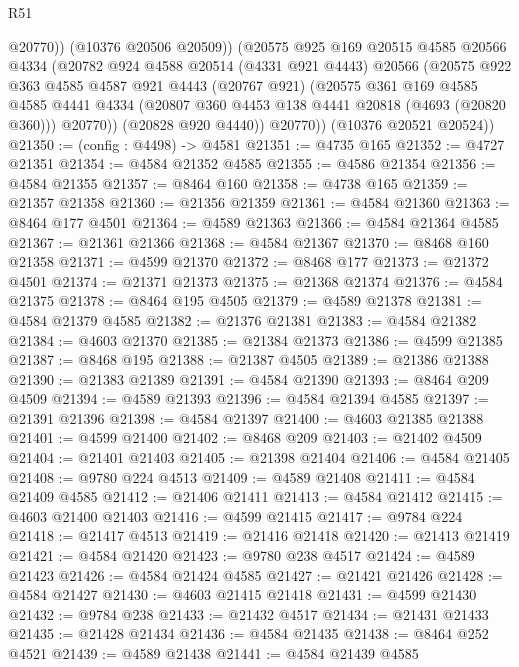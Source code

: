 \begin{lexlean}{R51}
\begin{coremodule}
              @20770))
          (@10376 @20506 @20509))
        (@20575
          @925
          @169
          @20515
          @4585
          @20566
          @4334
          (@20782
            @924
            @4588
            @20514
            (@4331 @921 @4443)
            @20566
            (@20575
              @922
              @363
              @4585
              @4587
              @921
              @4443
              (@20767 @921)
              (@20575
                @361
                @169
                @4585
                @4585
                @4441
                @4334
                (@20807 @360 @4453 @138 @4441 @20818 (@4693 (@20820 @360)))
                @20770))
            (@20828 @920 @4440))
          @20770))
      (@10376 @20521 @20524))
@21350 := (config : @4498) -> @4581
@21351 := @4735 @165
@21352 := @4727 @21351
@21354 := @4584 @21352 @4585
@21355 := @4586 @21354
@21356 := @4584 @21355
@21357 := @8464 @160
@21358 := @4738 @165
@21359 := @21357 @21358
@21360 := @21356 @21359
@21361 := @4584 @21360
@21363 := @8464 @177 @4501
@21364 := @4589 @21363
@21366 := @4584 @21364 @4585
@21367 := @21361 @21366
@21368 := @4584 @21367
@21370 := @8468 @160 @21358
@21371 := @4599 @21370
@21372 := @8468 @177
@21373 := @21372 @4501
@21374 := @21371 @21373
@21375 := @21368 @21374
@21376 := @4584 @21375
@21378 := @8464 @195 @4505
@21379 := @4589 @21378
@21381 := @4584 @21379 @4585
@21382 := @21376 @21381
@21383 := @4584 @21382
@21384 := @4603 @21370
@21385 := @21384 @21373
@21386 := @4599 @21385
@21387 := @8468 @195
@21388 := @21387 @4505
@21389 := @21386 @21388
@21390 := @21383 @21389
@21391 := @4584 @21390
@21393 := @8464 @209 @4509
@21394 := @4589 @21393
@21396 := @4584 @21394 @4585
@21397 := @21391 @21396
@21398 := @4584 @21397
@21400 := @4603 @21385 @21388
@21401 := @4599 @21400
@21402 := @8468 @209
@21403 := @21402 @4509
@21404 := @21401 @21403
@21405 := @21398 @21404
@21406 := @4584 @21405
@21408 := @9780 @224 @4513
@21409 := @4589 @21408
@21411 := @4584 @21409 @4585
@21412 := @21406 @21411
@21413 := @4584 @21412
@21415 := @4603 @21400 @21403
@21416 := @4599 @21415
@21417 := @9784 @224
@21418 := @21417 @4513
@21419 := @21416 @21418
@21420 := @21413 @21419
@21421 := @4584 @21420
@21423 := @9780 @238 @4517
@21424 := @4589 @21423
@21426 := @4584 @21424 @4585
@21427 := @21421 @21426
@21428 := @4584 @21427
@21430 := @4603 @21415 @21418
@21431 := @4599 @21430
@21432 := @9784 @238
@21433 := @21432 @4517
@21434 := @21431 @21433
@21435 := @21428 @21434
@21436 := @4584 @21435
@21438 := @8464 @252 @4521
@21439 := @4589 @21438
@21441 := @4584 @21439 @4585

\end{coremodule}
\end{lexlean}
